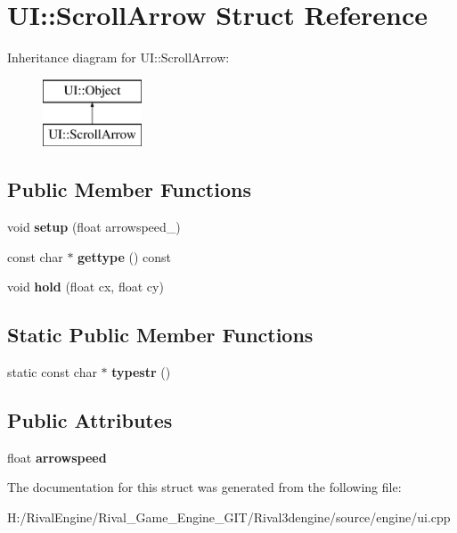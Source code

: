 \hypertarget{struct_u_i_1_1_scroll_arrow}{}\section{UI\+:\+:Scroll\+Arrow Struct Reference}
\label{struct_u_i_1_1_scroll_arrow}
Inheritance diagram for UI\+:\+:Scroll\+Arrow\+:\begin{figure}[H]
\begin{center}
\leavevmode
\includegraphics[height=2.000000cm]{struct_u_i_1_1_scroll_arrow}
\end{center}
\end{figure}
\subsection*{Public Member Functions}
\begin{DoxyCompactItemize}
\item 
\mbox{\label{struct_u_i_1_1_scroll_arrow_ac8e85607e246826269dcf6f41bab4945}} 
void {\bfseries setup} (float arrowspeed\+\_)
\item 
\mbox{\label{struct_u_i_1_1_scroll_arrow_afcd19a9c641f25b89b4b26c903acaf56}} 
const char $\ast$ {\bfseries gettype} () const
\item 
\mbox{\label{struct_u_i_1_1_scroll_arrow_a02f95b3bbf67743607a5a14a17c9062f}} 
void {\bfseries hold} (float cx, float cy)
\end{DoxyCompactItemize}
\subsection*{Static Public Member Functions}
\begin{DoxyCompactItemize}
\item 
\mbox{\label{struct_u_i_1_1_scroll_arrow_aed46c4ab636527f265f09072054027bc}} 
static const char $\ast$ {\bfseries typestr} ()
\end{DoxyCompactItemize}
\subsection*{Public Attributes}
\begin{DoxyCompactItemize}
\item 
\mbox{\label{struct_u_i_1_1_scroll_arrow_a867ba3909348a926371e1c887da8dda3}} 
float {\bfseries arrowspeed}
\end{DoxyCompactItemize}


The documentation for this struct was generated from the following file\+:\begin{DoxyCompactItemize}
\item 
H\+:/\+Rival\+Engine/\+Rival\+\_\+\+Game\+\_\+\+Engine\+\_\+\+G\+I\+T/\+Rival3dengine/source/engine/ui.\+cpp\end{DoxyCompactItemize}
